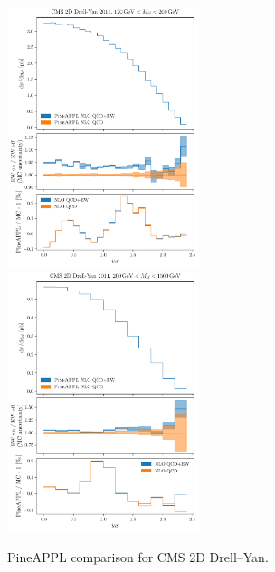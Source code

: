 \begin{figure}
    \centering
    \includegraphics[width=0.5\textwidth]{figures/pineappl_CMSDY2D11_bin5}%
    \includegraphics[width=0.5\textwidth]{figures/pineappl_CMSDY2D11_bin6}
    \caption{PineAPPL comparison for CMS 2D Drell--Yan.}
    \label{fig:cmsdy2d11_bins56}
\end{figure}


